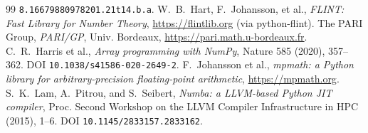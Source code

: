 \documentclass[11pt]{article}
\begin{document}
\begin{thebibliography}{99}
\texttt{8.16679880978201.21t14.b.a}.
 W.~B.~Hart, F.~Johansson, et al., \emph{FLINT: Fast Library
for Number Theory}, \url{https://flintlib.org} (via python-flint).
 The PARI Group, \emph{PARI/GP}, Univ. Bordeaux,
\url{https://pari.math.u-bordeaux.fr}.
 C.~R.~Harris et al., \emph{Array programming with NumPy},
Nature 585 (2020), 357--362. DOI \texttt{10.1038/s41586-020-2649-2}.
 F.~Johansson et al., \emph{mpmath: a Python library for
arbitrary-precision floating-point arithmetic}, \url{https://mpmath.org}.
 S.~K.~Lam, A.~Pitrou, and S.~Seibert, \emph{Numba: a
LLVM-based Python JIT compiler}, Proc. Second Workshop on the LLVM Compiler
Infrastructure in HPC (2015), 1--6. DOI \texttt{10.1145/2833157.2833162}.
\end{thebibliography}
\end{document}
